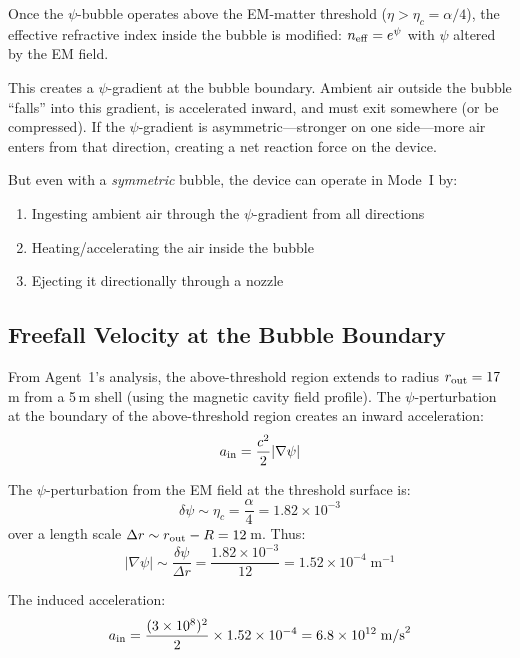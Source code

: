 \documentclass[12pt,letterpaper]{article}
\begin{document}
Once the $\psi$-bubble operates above the EM-matter threshold
($\eta > \eta_c = \alpha/4$), the effective refractive index inside the
bubble is modified: $n_{\rm eff} = e^\psi$ with $\psi$ altered by the EM field.

This creates a $\psi$-gradient at the bubble boundary. Ambient air outside the
bubble ``falls'' into this gradient, is accelerated inward, and must exit
somewhere (or be compressed). If the $\psi$-gradient is asymmetric---stronger
on one side---more air enters from that direction, creating a net reaction force
on the device.

But even with a \textit{symmetric} bubble, the device can operate in Mode~I by:
\begin{enumerate}
\item Ingesting ambient air through the $\psi$-gradient from all directions
\item Heating/accelerating the air inside the bubble
\item Ejecting it directionally through a nozzle
\end{enumerate}

\subsection{Freefall Velocity at the Bubble Boundary}

From Agent~1's analysis, the above-threshold region extends to radius
$r_{\rm out} = 17$\,m from a 5\,m shell (using the magnetic cavity
field profile). The $\psi$-perturbation at the boundary of the
above-threshold region creates an inward acceleration:
\begin{equation}
a_{\rm in} = \frac{c^2}{2}|\nabla\psi|
\end{equation}

The $\psi$-perturbation from the EM field at the threshold surface is:
\begin{equation}
\delta\psi \sim \eta_c = \frac{\alpha}{4} = 1.82 \times 10^{-3}
\end{equation}
over a length scale $\Delta r \sim r_{\rm out} - R = 12$\,m. Thus:
\begin{equation}
|\nabla\psi| \sim \frac{\delta\psi}{\Delta r} = \frac{1.82 \times 10^{-3}}{12} = 1.52 \times 10^{-4}\;\text{m}^{-1}
\end{equation}

The induced acceleration:
\begin{equation}
a_{\rm in} = \frac{(3 \times 10^8)^2}{2} \times 1.52 \times 10^{-4} = 6.8 \times 10^{12}\;\text{m/s}^2
\end{equation}
\end{document}
